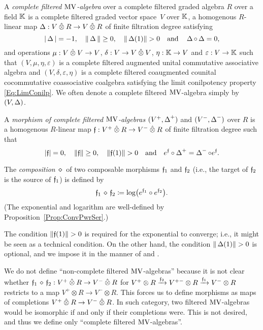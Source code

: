 \documentclass[\MainFolder/Text.tex]{subfiles}
\begin{document}
\begin{Definition}\label{Def:FilteredMV}
A \emph{complete filtered $\mathrm{MV}$-algebra} over a complete filtered graded algebra $R$ over a field $\mathbb{K}$ is a complete filtered graded vector space~$V$ over $\mathbb{K}$, a homogenous $R$-linear map $\BVOp: V\COtimes R \rightarrow V\COtimes R$ of finite filtration degree satisfying 
$$ \Abs{\BVOp} = -1, \quad \Norm{\BVOp}\ge 0,\quad\Norm{\BVOp(1)}>0 \quad\text{and}\quad\BVOp\circ \BVOp = 0,$$
and operations $\MVProd: V\COtimes V \rightarrow V$, $\MVCoProd: V \rightarrow V\COtimes V$, $\eta: \mathbb{K} \rightarrow V$ and $\varepsilon: V\rightarrow \mathbb{K}$ such that $(V,\mu,\eta,\varepsilon)$ is a complete filtered augmented unital commutative associative algebra and $(V,\delta,\varepsilon,\eta)$ is a complete filtered coaugmented counital cocommutative coassociative coalgebra satisfying the limit conilpotency property \eqref{Eq:LimConilp}. We often denote a complete filtered $\mathrm{MV}$-algebra simply by $(V,\operatorname{\Delta})$.

A \emph{morphism of complete filtered $\mathrm{MV}$-algebras} $(V^+,\operatorname{\Delta}^+)$ and $(V^-,\operatorname{\Delta}^-)$ over $R$ is a homogenous $R$-linear map $\MVMorF: V^+\COtimes R\rightarrow V^-\COtimes R$ of finite filtration degree such that 
$$ \Abs{\MVMorF} = 0,\quad \Norm{\MVMorF}\ge0, \quad \Norm{\MVMorF(1)}>0\quad\text{and}\quad e^{\MVMorF}\circ\BVOp^+ = \BVOp^- \circ e^\MVMorF. $$

The \emph{composition} $\DiamComp$ of two composable morphisms $\mathfrak{f}_1$ and $\mathfrak{f}_2$ (i.e., the target of $\mathfrak{f}_2$ is the source of $\mathfrak{f}_1$) is defined by
\begin{equation}\label{Eq:CompositionMV}
\MVMorF_1\DiamComp\MVMorF_2 \coloneqq \log(e^{\MVMorF_1}\circ e^{\MVMorF_2}).
\end{equation}
(The exponential and logarithm are well-defined by Proposition~\ref{Prop:ConvPwrSer}.)
\end{Definition}

\begin{Remark}\begin{RemarkList}
\item The condition $\Norm{\MVMorF(1)}>0$ is required for the exponential to converge; i.e., it might be seen as a technical condition. On the other hand, the condition $\Norm{\BVOp(1)}>0$ is optional, and we impose it in the manner of \cite{Markl2015} and \cite{Cieliebak2015}.
\item We do not define ``non-complete filtered $\mathrm{MV}$-algebras'' because it is not clear whether $\MVMorF_1\DiamComp\MVMorF_2: V^+\COtimes R \rightarrow V^-\COtimes R$ for $V^+\otimes R \xrightarrow{\mathfrak{f}_2} V^{+-}\otimes R \xrightarrow{\mathfrak{f}_1} V^-\otimes R$ restricts to a map $V^+\otimes R \rightarrow V^-\otimes R$. This forces us to define morphisms as maps of completions $V^+\COtimes R \rightarrow V^-\COtimes R$. In such category, two filtered $\mathrm{MV}$-algebras would be isomorphic if and only if their completions were. This is not desired, and thus we define only ``complete filtered $\mathrm{MV}$-algebras''.\qedhere
\end{RemarkList}\end{Remark}
\end{document}
